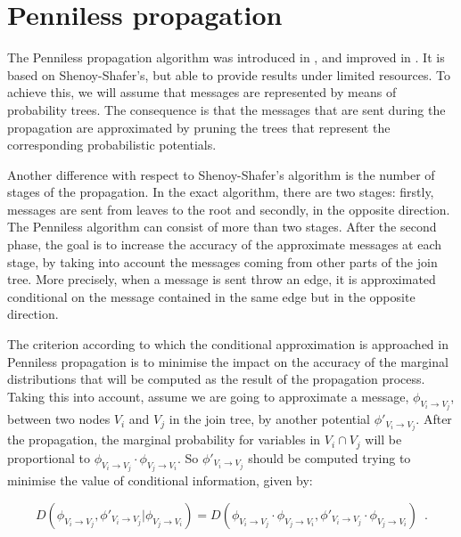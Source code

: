 \section{Penniless propagation}

The Penniless propagation algorithm was introduced in
\cite{Can00}, and improved in \cite{Can03}. It is based on
Shenoy-Shafer's, but able to provide results under limited
resources. To achieve this, we will assume that messages are
represented by means of probability trees. The consequence is that
the messages that are sent during the propagation are approximated
by pruning the trees that represent the corresponding
probabilistic potentials.

Another difference with respect to Shenoy-Shafer's algorithm is
the number of stages of the propagation. In the exact algorithm,
there are two stages: firstly, messages are sent from leaves to
the root and secondly, in the opposite direction. The Penniless
algorithm can consist of more than two stages. After the second
phase, the goal is to increase the accuracy of the approximate
messages at each stage, by taking into account the messages coming
from other parts of the join tree. More precisely, when a message
is sent throw an edge, it is approximated conditional on the
message contained in the same edge but in the opposite direction.

The criterion according to which the conditional approximation is
approached in Penniless propagation is to minimise the impact on
the accuracy of the marginal distributions that will be computed
as the result of the propagation process. Taking this into
account, assume we are going to approximate a message, $\phi_{V_i
  \rightarrow V_j}$, between two nodes $V_i$ and $V_j$ in the join
tree, by another potential $\phi'_{V_i \rightarrow V_j}$. After
the propagation, the marginal probability for variables in $V_i
\cap V_j$ will be proportional to $\phi_{V_i \rightarrow V_j}\cdot
\phi_{V_j \rightarrow V_i}$. So $\phi'_{V_i \rightarrow V_j}$
should be computed trying to minimise the value of conditional
information, given by:

\begin{equation}
  \label{eq:distanciacondicional}
  D(\phi_{V_i \rightarrow V_j},\phi'_{V_i \rightarrow V_j}|\phi_{V_j
    \rightarrow V_i}) =
  D(\phi_{V_i \rightarrow V_j}\cdot \phi_{V_j \rightarrow
    V_i},\phi'_{V_i \rightarrow V_j} \cdot \phi_{V_j \rightarrow
    V_i})\enspace .
\end{equation}

